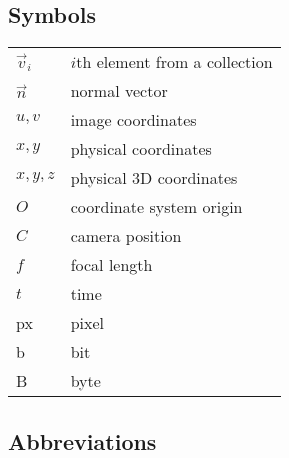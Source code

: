 
\subsection*{Symbols}

\begin{tabular}{ll}
$\vec v_i$	& $i$th element from a collection\\
$\vec n$	& normal vector\\
$u, v$		& image coordinates\\
$x, y$		& physical coordinates\\
$x, y, z$	& physical 3D coordinates\\
$O$			& coordinate system origin\\
$C$			& camera position\\
$f$			& focal length\\
$t$			& time\\
px			& pixel\\
b			& bit\\
B			& byte\\
\end{tabular}
%
%

\subsection*{Abbreviations}

